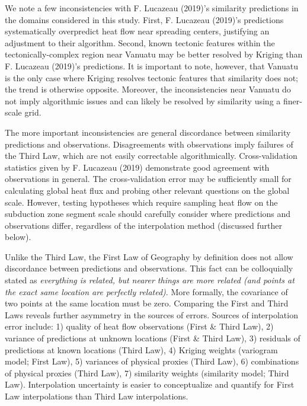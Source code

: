 \documentclass[draft,linenumbers]{agujournal2018}
\begin{document}
We note a few inconsistencies with F. Lucazeau (2019)'s similarity
predictions in the domains considered in this study. First, F. Lucazeau
(2019)'s predictions systematically overpredict heat flow near spreading
centers, justifying an adjustment to their algorithm. Second, known
tectonic features within the tectonically-complex region near Vanuatu
may be better resolved by Kriging than F. Lucazeau (2019)'s predictions.
It is important to note, however, that Vanuatu is the only case where
Kriging resolves tectonic features that similarity does not; the trend
is otherwise opposite. Moreover, the inconsistencies near Vanuatu do not
imply algorithmic issues and can likely be resolved by similarity using
a finer-scale grid.

The more important inconsistencies are general discordance between
similarity predictions and observations. Disagreements with observations
imply failures of the Third Law, which are not easily correctable
algorithmically. Cross-validation statistics given by F. Lucazeau (2019)
demonstrate good agreement with observations in general. The
cross-validation error may be sufficiently small for calculating global
heat flux and probing other relevant questions on the global scale.
However, testing hypotheses which require sampling heat flow on the
subduction zone segment scale should carefully consider where
predictions and observations differ, regardless of the interpolation
method (discussed further below).

Unlike the Third Law, the First Law of Geography by definition does not
allow discordance between predictions and observations. This fact can be
colloquially stated as \emph{everything is related, but nearer things
are more related (and points at the exact same location are perfectly
related)}. More formally, the covariance of two points at the same
location must be zero. Comparing the First and Third Laws reveals
further asymmetry in the sources of errors. Sources of interpolation
error include: 1) quality of heat flow observations (First \& Third
Law), 2) variance of predictions at unknown locations (First \& Third
Law), 3) residuals of predictions at known locations (Third Law), 4)
Kriging weights (variogram model; First Law), 5) variances of physical
proxies (Third Law), 6) combinations of physical proxies (Third Law), 7)
similarity weights (similarity model; Third Law). Interpolation
uncertainty is easier to conceptualize and quantify for First Law
interpolations than Third Law interpolations.
\end{document}
